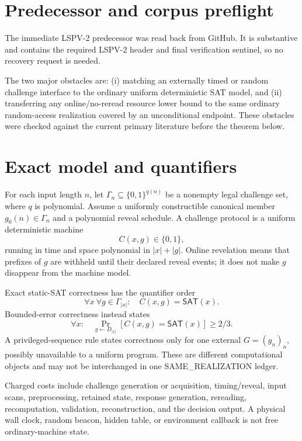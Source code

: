 \documentclass[11pt]{article}
\newcommand{\SAT}{\mathsf{SAT}}
\begin{document}
\section{Predecessor and corpus preflight}

The immediate LSPV-2 predecessor
was read back from GitHub.  It is substantive and contains the required
LSPV-2 header and final verification sentinel, so no recovery request is
needed.

The two major obstacles are: (i) matching an externally timed or random
challenge interface to the ordinary uniform deterministic SAT model, and
(ii) transferring any online/no-reread resource lower bound to the same
ordinary random-access realization covered by an unconditional endpoint.
These obstacles were checked against the current primary literature before
the theorem below.

\section{Exact model and quantifiers}

For each input length $n$, let $\Gamma_n\subseteq\{0,1\}^{q(n)}$ be a
nonempty legal challenge set, where $q$ is polynomial.  Assume a uniformly
constructible canonical member $g_0(n)\in\Gamma_n$ and a polynomial reveal
schedule.  A challenge protocol is a uniform deterministic machine
\[
                 C(x,g)\in\{0,1\},                            \tag{1}
\]
running in time and space polynomial in $|x|+|g|$.  Online revelation means
that prefixes of $g$ are withheld until their declared reveal events; it does
not make $g$ disappear from the machine model.

Exact static-SAT correctness has the quantifier order
\[
 \forall x\ \forall g\in\Gamma_{|x|}:\quad C(x,g)=\SAT(x).   \tag{2}
\]
Bounded-error correctness instead states
\[
 \forall x:\quad
 \Pr_{g\leftarrow D_{|x|}}[C(x,g)=\SAT(x)]\ge 2/3.            \tag{3}
\]
A privileged-sequence rule states correctness only for one external
$G=(g_n)_n$, possibly unavailable to a uniform program.  These are different
computational objects and may not be interchanged in one SAME\_REALIZATION
ledger.

Charged costs include challenge generation or acquisition, timing/reveal,
input scans, preprocessing, retained state, response generation, rereading,
recomputation, validation, reconstruction, and the decision output.  A
physical wall clock, random beacon, hidden table, or environment callback is
not free ordinary-machine state.
\end{document}
